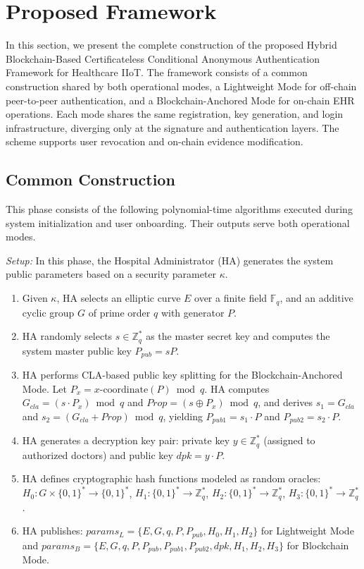 \documentclass[conference]{IEEEtran}
\begin{document}
\section{Proposed Framework}

In this section, we present the complete construction of the proposed Hybrid Blockchain-Based Certificateless Conditional Anonymous Authentication Framework for Healthcare IIoT. The framework consists of a common construction shared by both operational modes, a Lightweight Mode for off-chain peer-to-peer authentication, and a Blockchain-Anchored Mode for on-chain EHR operations. Each mode shares the same registration, key generation, and login infrastructure, diverging only at the signature and authentication layers. The scheme supports user revocation and on-chain evidence modification.

\subsection{Common Construction}

This phase consists of the following polynomial-time algorithms executed during system initialization and user onboarding. Their outputs serve both operational modes.

\textit{Setup:} In this phase, the Hospital Administrator (HA) generates the system public parameters based on a security parameter $\kappa$.

\begin{enumerate}
\item Given $\kappa$, HA selects an elliptic curve $E$ over a finite field $\mathbb{F}_q$, and an additive cyclic group $G$ of prime order $q$ with generator $P$.

\item HA randomly selects $s \in \mathbb{Z}_q^*$ as the master secret key and computes the system master public key $P_{pub} = sP$.

\item HA performs CLA-based public key splitting for the Blockchain-Anchored Mode. Let $P_x = x\text{-coordinate}(P) \bmod q$. HA computes $G_{cla} = (s \cdot P_x) \bmod q$ and $Prop = (s \oplus P_x) \bmod q$, and derives $s_1 = G_{cla}$ and $s_2 = (G_{cla} + Prop) \bmod q$, yielding $P_{pub1} = s_1 \cdot P$ and $P_{pub2} = s_2 \cdot P$.

\item HA generates a decryption key pair: private key $y \in \mathbb{Z}_q^*$ (assigned to authorized doctors) and public key $dpk = y \cdot P$.

\item HA defines cryptographic hash functions modeled as random oracles:
$H_0 : G \times \{0,1\}^* \rightarrow \{0,1\}^*$,
$H_1 : \{0,1\}^* \rightarrow \mathbb{Z}_q^*$,
$H_2 : \{0,1\}^* \rightarrow \mathbb{Z}_q^*$,
$H_3 : \{0,1\}^* \rightarrow \mathbb{Z}_q^*$.

\item HA publishes:
$params_L = \{E, G, q, P, P_{pub}, H_0, H_1, H_2\}$ for Lightweight Mode and
$params_B = \{E, G, q, P, P_{pub}, P_{pub1}, P_{pub2}, dpk, H_1, H_2, H_3\}$ for Blockchain Mode.
\end{enumerate}
\end{document}

